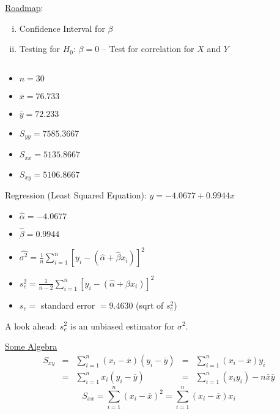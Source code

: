 \underline{Roadmap}:
\begin{enumerate}[(i)]
    \item Confidence Interval for $ \beta $
    \item Testing for $ H_0 $: $ \beta=0 $ -- Test for correlation for
          $ X $ and $ Y $
\end{enumerate}

\begin{exbox}
    \begin{example} $ \; $
        \begin{itemize}
            \item $ n=30 $
            \item $ \overline{x}=76.733 $
            \item $ \overline{y}=72.233 $
            \item $ S_{yy}=7585.3667 $
            \item $ S_{xx}=5135.8667 $
            \item $ S_{xy}=5106.8667 $
        \end{itemize}
        Regression (Least Squared Equation): $ y=-4.0677+0.9944x $
        \begin{itemize}
            \item $ \hat{\alpha}=-4.0677 $
            \item $ \hat{\beta}=0.9944 $
            \item $ \hat{\sigma^2}=\frac{1}{n} \sum\limits_{i=1}^{n} \left[ y_i-(\hat{\alpha}+\hat{\beta}x_i) \right]^2 $
            \item $ s_e^2=\frac{1}{n-2} \sum\limits_{i=1}^{n} \left[ y_i-(\hat{\alpha}+\beta x_i) \right]^2 $
            \item $ s_e = $ standard error $ =9.4630 $ (sqrt of $ s_e^2 $)
        \end{itemize}
        A look ahead: $ s_e^2 $ is an unbiased estimator for $ \sigma^2 $.
    \end{example}
\end{exbox}
\underline{Some Algebra}
\[ \begin{aligned}
        S_{xy} & = & \sum\limits_{i=1}^{n} (x_i-\overline{x})(y_i-\overline{y}) & = & \sum\limits_{i=1}^{n} (x_i-\overline{x})y_i                \\
               & = & \sum\limits_{i=1}^{n} x_i(y_i-\overline{y})                & = & \sum\limits_{i=1}^{n} (x_iy_i) - n\overline{x}\overline{y}
    \end{aligned}
\]
\[ S_{xx}=\sum\limits_{i=1}^{n}(x_i-\overline{x})^2=\sum\limits_{i=1}^{n} (x_i-\overline{x})x_i \]
